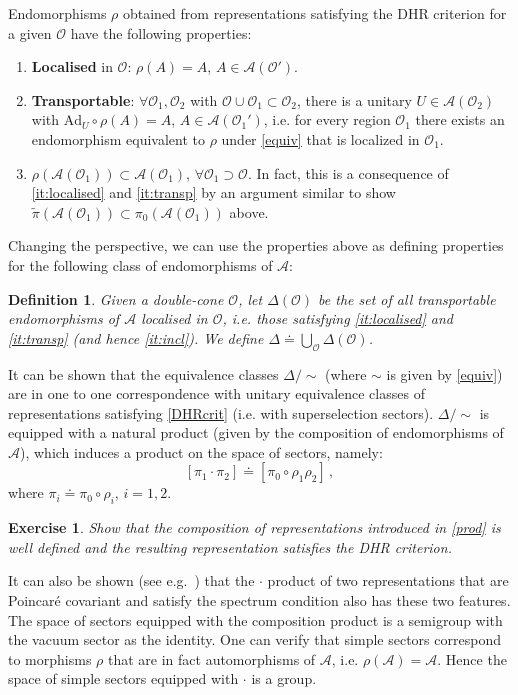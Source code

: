 \documentclass[12pt,a4paper]{article}
\newcommand{\1}{\mathds{1}}                         %
\newcommand{\Ocal}{\mathcal{O}}
\newcommand{\Ac}{{\mathcal{A}}}
\newcommand{\be}{\begin{equation}}
\newcommand{\ee}{\end{equation}}
\newtheorem{exercise}[theorem]{Exercise}
\newtheorem{df}[theorem]{Definition}}
\begin{document}
Endomorphisms $\rho$ obtained from representations satisfying the DHR criterion for a given $\Ocal$ have the following properties: \cite{KlausSuperselection}
	\begin{enumerate}[label=\bf LE\arabic{enumi},leftmargin=*,widest=4] 
	\item \textbf{Localised} in $\Ocal$: $\rho(A)=A$, $A\in\Ac(\Ocal')$.\label{it:localised}
	\item \textbf{Transportable}: $\forall \Ocal_1,\Ocal_2$ with $\Ocal\cup\Ocal_1\subset \Ocal_2$, there is a unitary $U\in \Ac(\Ocal_2)$ with $\mathrm{Ad}_U\circ\rho(A)=A$, $A\in\Ac(\Ocal_1')$, i.e. for every region $\Ocal_1$ there exists an endomorphism equivalent to $\rho$  under \eqref{equiv} that is localized in $\Ocal_1$. \label{it:transp}
	\item $\rho(\Ac(\Ocal_1))\subset \Ac(\Ocal_1)$, $\forall \Ocal_1\supset\Ocal$.  In fact, this is a consequence of \ref{it:localised} and \ref{it:transp} by an argument similar to show $\tilde{\pi}(\Ac(\Ocal_1))\subset \pi_0(\Ac(\Ocal_1))$ above. \label{it:incl}
\end{enumerate}
Changing the perspective, we can use the properties above  
as defining properties for the following class of endomorphisms of $\Ac$:
\begin{df}
	Given a double-cone $\Ocal$, let $\Delta(\Ocal)$ be the set of all transportable endomorphisms of $\Ac$ localised in $\Ocal$, i.e.  those satisfying \ref{it:localised} and \ref{it:transp} (and hence \ref{it:incl}). We define
	 $\Delta\doteq \bigcup_\Ocal \Delta(\Ocal)$. 
\end{df}
It can be shown that the equivalence classes $\Delta/\sim$ (where $\sim$ is given by \eqref{equiv}) are in one to one correspondence with unitary equivalence classes of representations satisfying \eqref{DHRcrit} (i.e. with superselection sectors).  $\Delta/\sim$ is equipped with a natural product (given by the composition of endomorphisms of $\Ac$), which induces a product on the space of sectors, namely:
	\be\label{prod}
	[\pi_1\cdot \pi_2]\doteq [\pi_0\circ \rho_1\rho_2]\,,
	\ee
	where $\pi_i\doteq \pi_0\circ \rho_i$, $i=1,2$.
\begin{exercise}
	Show that the composition of representations introduced in \eqref{prod} is well defined and the resulting representation satisfies the DHR criterion.
\end{exercise}
It can also be shown (see e.g.~\cite{KlausSuperselection}) that the $\cdot$ product of two representations that are Poincar\'e covariant and satisfy the spectrum condition also has these two features. The space of sectors  equipped with the composition product is a semigroup with the vacuum sector as the identity. One can verify that simple sectors correspond to morphisms $\rho$ that are in fact automorphisms of $\Ac$, i.e. $\rho(\Ac)=\Ac$. Hence the space of simple sectors equipped with $\cdot$ is a group. 
\end{document}
